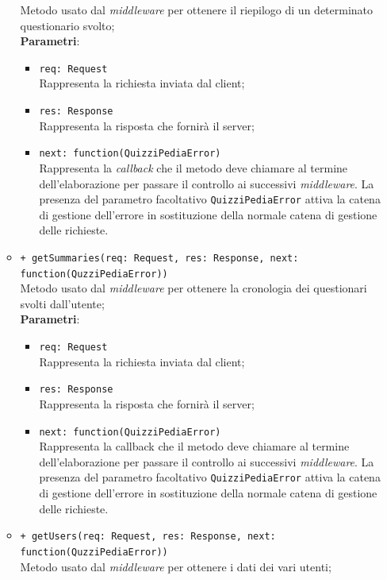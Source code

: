 \begin{itemize}
\begin{itemize}
		Metodo usato dal \textit{middleware} per ottenere il riepilogo di un determinato questionario svolto; \\
		\textbf{Parametri}:
		 \begin{itemize}
		  \item
			\texttt{req: Request} \\
			Rappresenta la richiesta inviata dal client;
		  \item
			\texttt{res: Response} \\
			Rappresenta la risposta che fornirà il server;
		  \item
		    \texttt{next: function(QuizziPediaError)} \\
			Rappresenta la \textit{callback} che il metodo deve chiamare al termine dell'elaborazione per passare il controllo ai successivi \textit{middleware}. La presenza del parametro facoltativo \texttt{QuizziPediaError} attiva la catena di gestione dell'errore in sostituzione della normale catena di gestione delle richieste.
		 \end{itemize}
		 \item
		  \texttt{+ getSummaries(req: Request, res: Response, next: function(QuzziPediaError))} \\
		Metodo usato dal \textit{middleware} per ottenere la cronologia dei questionari svolti dall'utente; \\
		\textbf{Parametri}:
		 \begin{itemize}
		  \item
			\texttt{req: Request} \\
			Rappresenta la richiesta inviata dal client;
		  \item
			\texttt{res: Response} \\
			Rappresenta la risposta che fornirà il server;
		  \item
		    \texttt{next: function(QuizziPediaError)} \\
			Rappresenta la callback che il metodo deve chiamare al termine dell'elaborazione per passare il controllo ai successivi \textit{middleware}. La presenza del parametro facoltativo \texttt{QuizziPediaError} attiva la catena di gestione dell'errore in sostituzione della normale catena di gestione delle richieste.
		 \end{itemize}
		  \item
		 	 \texttt{+ getUsers(req: Request, res: Response, next: function(QuzziPediaError))} \\
		Metodo usato dal \textit{middleware} per ottenere i dati dei vari utenti; \\

\end{itemize}
\end{itemize}
